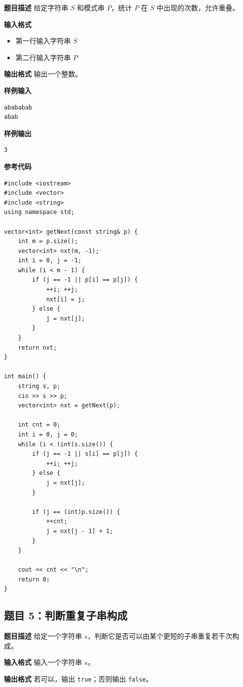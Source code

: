 \documentclass[12pt,a4paper]{article}
\begin{document}
\textbf{题目描述}  
给定字符串 $S$ 和模式串 $P$，统计 $P$ 在 $S$ 中出现的次数，允许重叠。

\textbf{输入格式}
\begin{itemize}
    \item 第一行输入字符串 $S$
    \item 第二行输入字符串 $P$
\end{itemize}

\textbf{输出格式}  
输出一个整数。

\textbf{样例输入}
\begin{lstlisting}
abababab
abab
\end{lstlisting}

\textbf{样例输出}
\begin{lstlisting}
3
\end{lstlisting}

\textbf{参考代码}
\begin{lstlisting}
#include <iostream>
#include <vector>
#include <string>
using namespace std;

vector<int> getNext(const string& p) {
    int m = p.size();
    vector<int> nxt(m, -1);
    int i = 0, j = -1;
    while (i < m - 1) {
        if (j == -1 || p[i] == p[j]) {
            ++i; ++j;
            nxt[i] = j;
        } else {
            j = nxt[j];
        }
    }
    return nxt;
}

int main() {
    string s, p;
    cin >> s >> p;
    vector<int> nxt = getNext(p);

    int cnt = 0;
    int i = 0, j = 0;
    while (i < (int)s.size()) {
        if (j == -1 || s[i] == p[j]) {
            ++i; ++j;
        } else {
            j = nxt[j];
        }

        if (j == (int)p.size()) {
            ++cnt;
            j = nxt[j - 1] + 1;
        }
    }

    cout << cnt << "\n";
    return 0;
}
\end{lstlisting}

\subsection*{题目 5：判断重复子串构成}

\textbf{题目描述}  
给定一个字符串 $s$，判断它是否可以由某个更短的子串重复若干次构成。

\textbf{输入格式}  
输入一个字符串 $s$。

\textbf{输出格式}  
若可以，输出 \texttt{true}；否则输出 \texttt{false}。
\end{document}
